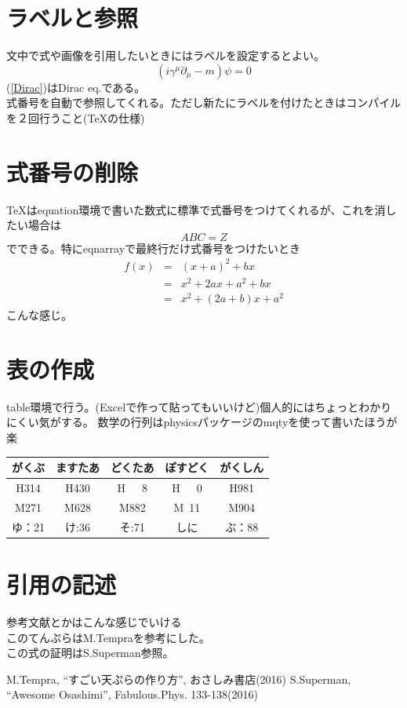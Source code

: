 \documentclass[11pt]{report}
\begin{document}
\section{ラベルと参照}
文中で式や画像を引用したいときにはラベルを設定するとよい。
\begin{equation}
(i\gamma^\mu\partial_\mu-m)\psi=0
\label{Dirac}%
\end{equation}
(\ref{Dirac})はDirac eq.である。\\
式番号を自動で参照してくれる。ただし新たにラベルを付けたときはコンパイルを２回行うこと(TeXの仕様)
\section{式番号の削除}
TeXはequation環境で書いた数式に標準で式番号をつけてくれるが、これを消したい場合は
\begin{equation}
ABC=Z\nonumber
\end{equation}
でできる。特にeqnarrayで最終行だけ式番号をつけたいとき
\begin{eqnarray}
f(x)&=&(x+a)^2+bx \nonumber \\
&=&x^2+2ax+a^2+bx\nonumber \\
&=&x^2+(2a+b)x+a^2
\end{eqnarray}
こんな感じ。


\section{表の作成}
table環境で行う。(Excelで作って貼ってもいいけど)個人的にはちょっとわかりにくい気がする。
数学の行列はphysicsパッケージのmqtyを使って書いたほうが楽
\begin{table}
  \begin{tabular}{|c|c|c|c|c|} \hline
    がくぶ & ますたあ & どくたあ &ぽすどく & がくしん \\ \hline \hline
    H314 & H430      & H\ \ \ 8         & H\ \ \ 0        &H981 \\
    M271 & M628    & M882   & M\ 11     &M904 \\ 
    ゆ：21 & け:36     & そ:71    &しに        &ぶ：88  \\ \hline
  \end{tabular}
\end{table}


\section{引用の記述}
参考文献とかはこんな感じでいける\\
このてんぷらはM.Tempra\cite{Tempra}を参考にした。\\
この式の証明はS.Superman\cite{Awesome}参照。
\begin{thebibliography}{10}%
  M.Tempra, ``すごい天ぷらの作り方'', おさしみ書店(2016)%
  S.Superman, ``Awesome Osashimi'', Fabulous.Phys. 133-138(2016)%
\end{thebibliography}
\end{document}
